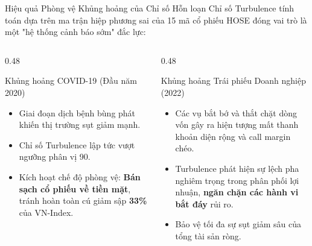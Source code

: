 \documentclass[10pt,aspectratio=169]{beamer}
\begin{document}
\begin{frame}{Hiệu quả Phòng vệ Khủng hoảng của Chỉ số Hỗn loạn}
  Chỉ số Turbulence tính toán dựa trên ma trận hiệp phương sai của 15 mã cổ phiếu HOSE đóng vai trò là một "hệ thống cảnh báo sớm" đắc lực:
  \vspace{0.3cm}
  \begin{columns}[t]
    \begin{column}{0.48\textwidth}
      \begin{block}{Khủng hoảng COVID-19 (Đầu năm 2020)}
        \begin{itemize}
          \item Giai đoạn dịch bệnh bùng phát khiến thị trường sụt giảm mạnh.
          \item Chỉ số Turbulence lập tức vượt ngưỡng phân vị 90.
          \item Kích hoạt chế độ phòng vệ: \textbf{Bán sạch cổ phiếu về tiền mặt}, tránh hoàn toàn cú giảm sập \textbf{33\%} của VN-Index.
        \end{itemize}
      \end{block}
    \end{column}
    
    \begin{column}{0.48\textwidth}
      \begin{block}{Khủng hoảng Trái phiếu Doanh nghiệp (2022)}
        \begin{itemize}
          \item Các vụ bắt bớ và thắt chặt dòng vốn gây ra hiện tượng mất thanh khoản diện rộng và call margin chéo.
          \item Turbulence phát hiện sự lệch pha nghiêm trọng trong phân phối lợi nhuận, \textbf{ngăn chặn các hành vi bắt đáy} rủi ro.
          \item Bảo vệ tối đa sự sụt giảm sâu của tổng tài sản ròng.
        \end{itemize}
      \end{block}
    \end{column}
  \end{columns}
\end{frame}
\end{document}
